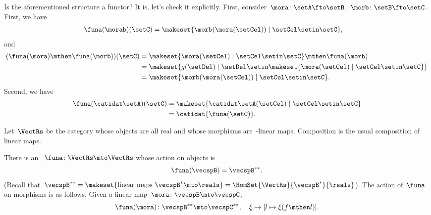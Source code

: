 \begin{example}
    Is the aforementioned structure a functor?
    It is, let's check it explicitly.
    First, consider~$\mora\colon \setA\fto \setB$,~$\morb\colon \setB \fto \setC$.
    First, we have
    \begin{equation}
        \begin{aligned}
            \funa(\morab)(\setC) & =\makeset{ \morb(\mora(\setCel))\mid \setCel \setin \setC},
        \end{aligned}
    \end{equation}
    and
    \begin{equation}
        \begin{aligned}
            (\funa(\mora)\mthen \funa(\morb))(\setC)
             & =\makeset{ \mora(\setCel) \mid \setCel \setin \setC}\mthen \funa(\morb) \\
             & =\makeset{g(\setDel)\mid \setDel \setin \makeset{\mora(\setCel)\mid \setCel\setin \setC}} \\
             & =\makeset{ \morb(\mora(\setCel))\mid \setCel \setin \setC}.
        \end{aligned}
    \end{equation}
    Second, we have
    \begin{equation}
        \begin{aligned}
            \funa(\catidat\setA)(\setC) & = \makeset{\catidat\setA(\setCel)\mid \setCel \setin \setC} \\
                                        & =\catidat{\funa(\setC)}.
        \end{aligned}
    \end{equation}
\end{example}

\begin{example}
    \label{exa:double-dual-functor}
    Let~$\VectRs$ be the category whose objects are all real  and whose morphisms are~\reals-linear maps.
    Composition is the usual composition of linear maps.

    There is an ~$\funa \colon \VectRs \mto \VectRs$ whose action on objects is
    \begin{equation}
        \funa ( \vecspB ) = \vecspB^{**}.
    \end{equation}
    (Recall that~$\vecspB^{**} = \makeset{ \text{linear maps } \vecspB^* \mto \reals } =  \HomSet{\VectRs}{\vecspB^*}{\reals}$).
    The action of~$\funa$ on morphisms is as follows.
    Given a linear map~$\mora \colon \vecspB \mto \vecspC$,
    \begin{equation}
        \funa ( \mora ) \colon \vecspB^{**} \mto \vecspC^{**}, \quad \xi \mapsto [ l \mapsto \xi (f \mthen l)].
    \end{equation}
\end{example}

